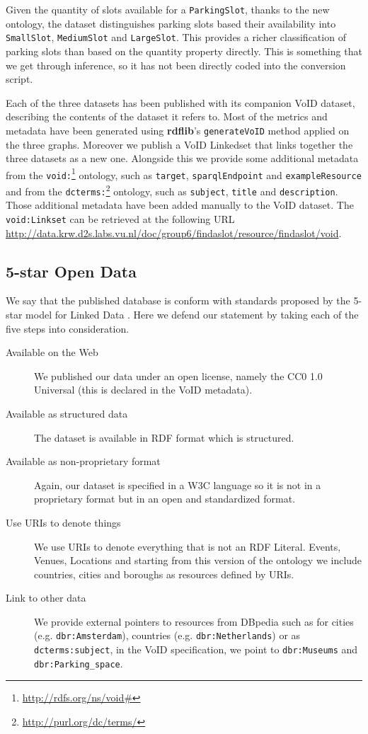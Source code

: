 \documentclass[runningheads,a4paper]{../../StyleFiles/llncs}
\begin{document}
Given the quantity of slots available for a \texttt{ParkingSlot}, thanks to the
new ontology, the dataset distinguishes parking slots based their availability
into \texttt{SmallSlot}, \texttt{MediumSlot} and \texttt{LargeSlot}. This
provides a richer classification of parking slots than based on the quantity
property directly. This is something that we get through inference, so it has
not been directly coded into the conversion script.

Each of the three datasets has been published with its companion VoID dataset,
describing the contents of the dataset it refers to. Most of the metrics and
metadata have been generated using \textbf{rdflib}'s \texttt{generateVoID}
method applied on the three graphs.
Moreover we publish a VoID Linkedset that links together the three datasets as a
new one. Alongside this we provide some additional metadata from the
\texttt{void:}\footnote{\url{http://rdfs.org/ns/void#}} ontology, such as
\texttt{target}, \texttt{sparqlEndpoint} and
\texttt{exampleResource} and from the
\texttt{dcterms:}\footnote{\url{http://purl.org/dc/terms/}} ontology, such as
\texttt{subject}, \texttt{title} and
\texttt{description}. Those additional metadata have been added manually
to the VoID dataset. The \texttt{void:Linkset} can be retrieved at the following
URL \url{http://data.krw.d2s.labs.vu.nl/doc/group6/findaslot/resource/findaslot/void}.

\subsection{5-star Open Data}
We say that the published database is conform with standards proposed by the
5-star model for Linked Data \cite{janowicz2014five}. Here we defend our statement by taking each of the
five steps into consideration.

\begin{description}
\item[Available on the Web] We published our data under an open license,
namely the CC0 1.0 Universal (this is declared in the VoID metadata).
\item[Available as structured data] The dataset is available in RDF
format which is structured.
\item[Available as non-proprietary format] Again, our dataset is specified
in a W3C language so it is not in a proprietary format but in an
open and standardized format.
\item[Use URIs to denote things] We use URIs to denote everything that is
not an RDF Literal. Events, Venues, Locations and starting from this version of
the ontology we include countries, cities and boroughs as resources defined by
URIs.
\item[Link to other data] We provide external pointers to resources from
DBpedia such as for cities (e.g. \texttt{dbr:Amsterdam}), countries (e.g.
\texttt{dbr:Netherlands}) or as \texttt{dcterms:subject}, in the VoID
specification, we point to \texttt{dbr:Museums} and \texttt{dbr:Parking\_space}.
\end{description}
\end{document}
